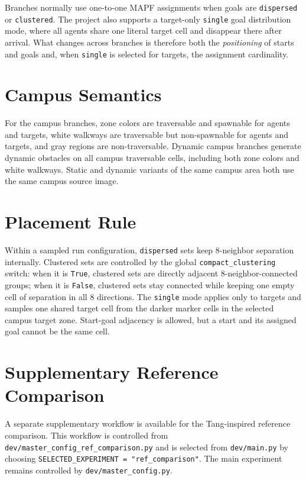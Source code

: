 \documentclass[11pt]{article}
\begin{document}
Branches normally use one-to-one MAPF assignments when goals are \texttt{dispersed} or \texttt{clustered}. The project also supports a target-only \texttt{single} goal distribution mode, where all agents share one literal target cell and disappear there after arrival. What changes across branches is therefore both the \emph{positioning} of starts and goals and, when \texttt{single} is selected for targets, the assignment cardinality.

\section{Campus Semantics}

For the campus branches, zone colors are traversable and spawnable for agents and targets, white walkways are traversable but non-spawnable for agents and targets, and gray regions are non-traversable. Dynamic campus branches generate dynamic obstacles on all campus traversable cells, including both zone colors and white walkways. Static and dynamic variants of the same campus area both use the same campus source image.

\section{Placement Rule}

Within a sampled run configuration, \texttt{dispersed} sets keep 8-neighbor separation internally. Clustered sets are controlled by the global \texttt{compact\_clustering} switch: when it is \texttt{True}, clustered sets are directly adjacent 8-neighbor-connected groups; when it is \texttt{False}, clustered sets stay connected while keeping one empty cell of separation in all 8 directions. The \texttt{single} mode applies only to targets and samples one shared target cell from the darker marker cells in the selected campus target zone. Start-goal adjacency is allowed, but a start and its assigned goal cannot be the same cell.

\section{Supplementary Reference Comparison}

A separate supplementary workflow is available for the Tang-inspired reference comparison. This workflow is controlled from \texttt{dev/master\_config\_ref\_comparison.py} and is selected from \texttt{dev/main.py} by choosing \texttt{SELECTED\_EXPERIMENT = "ref\_comparison"}. The main experiment remains controlled by \texttt{dev/master\_config.py}.
\end{document}
